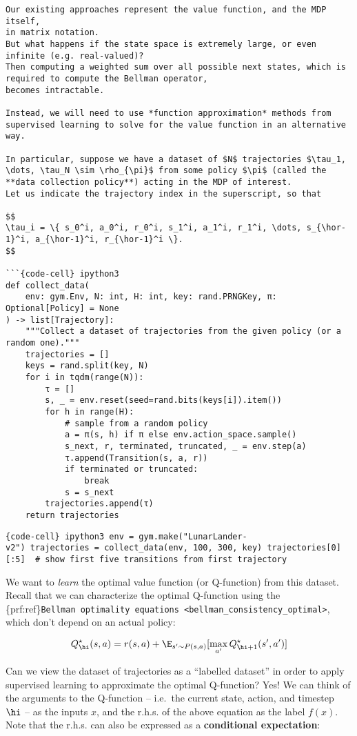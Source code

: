 \begin{verbatim}
Our existing approaches represent the value function, and the MDP itself,
in matrix notation.
But what happens if the state space is extremely large, or even infinite (e.g. real-valued)?
Then computing a weighted sum over all possible next states, which is required to compute the Bellman operator,
becomes intractable.

Instead, we will need to use *function approximation* methods from supervised learning to solve for the value function in an alternative way.

In particular, suppose we have a dataset of $N$ trajectories $\tau_1, \dots, \tau_N \sim \rho_{\pi}$ from some policy $\pi$ (called the **data collection policy**) acting in the MDP of interest.
Let us indicate the trajectory index in the superscript, so that

$$
\tau_i = \{ s_0^i, a_0^i, r_0^i, s_1^i, a_1^i, r_1^i, \dots, s_{\hor-1}^i, a_{\hor-1}^i, r_{\hor-1}^i \}.
$$

```{code-cell} ipython3
def collect_data(
    env: gym.Env, N: int, H: int, key: rand.PRNGKey, π: Optional[Policy] = None
) -> list[Trajectory]:
    """Collect a dataset of trajectories from the given policy (or a random one)."""
    trajectories = []
    keys = rand.split(key, N)
    for i in tqdm(range(N)):
        τ = []
        s, _ = env.reset(seed=rand.bits(keys[i]).item())
        for h in range(H):
            # sample from a random policy
            a = π(s, h) if π else env.action_space.sample()
            s_next, r, terminated, truncated, _ = env.step(a)
            τ.append(Transition(s, a, r))
            if terminated or truncated:
                break
            s = s_next
        trajectories.append(τ)
    return trajectories
\end{verbatim}

\texttt{\{code-cell\}\ ipython3\ env\ =\ gym.make("LunarLander-v2")\ trajectories\ =\ collect\_data(env,\ 100,\ 300,\ key)\ trajectories{[}0{]}{[}:5{]}\ \ \#\ show\ first\ five\ transitions\ from\ first\ trajectory}

We want to \emph{learn} the optimal value function (or Q-function) from
this dataset. Recall that we can characterize the optimal Q-function
using the
\{prf:ref\}\texttt{Bellman\ optimality\ equations\ \textless{}bellman\_consistency\_optimal\textgreater{}},
which don't depend on an actual policy:

\[
Q_\hi^\star(s, a) = r(s, a) + \E_{s' \sim P(s, a)} [\max_{a'} Q_{\hi+1}^\star(s', a')]
\]

Can we view the dataset of trajectories as a ``labelled dataset'' in
order to apply supervised learning to approximate the optimal
Q-function? Yes! We can think of the arguments to the Q-function --
i.e.~the current state, action, and timestep \(\hi\) -- as the inputs
\(x\), and the r.h.s. of the above equation as the label \(f(x)\). Note
that the r.h.s. can also be expressed as a \textbf{conditional
expectation}:

